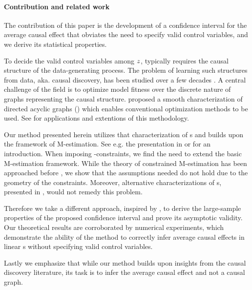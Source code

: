 \paragraph{Contribution and related work} The contribution of this paper is the development of a confidence interval for the average causal effect that obviates the need to specify valid control variables, and we derive its statistical properties.

To decide the valid control variables among $z$, typically requires the causal structure of the data-generating process. The problem of learning such structures from data, aka. causal discovery, has been studied over a few decades \citep{spirtes_causation_1993, pearl_causality:_2009,peters_elements_2017}. A central challenge of the field is to optimize model fitness over the discrete nature of graphs representing the causal structure. \citet{zheng_dags_2018} proposed a smooth characterization of directed acyclic graphs (\DAG{}) which enables conventional optimization methods to be used. See \citep{yu_daggnn_2019,ke_learning_2019,brouillard_diffrential_2020,zheng_learning_2020,kyono_2020} for applications and extentions of this methodology. 

Our method presented herein utilizes that characterization of \DAG{}s and builds upon the  framework of M-estimation. See e.g. the presentation in \citep[ch. 12]{wooldridge_econometric_2010} or \citet{vaart_m-_1998} for an introduction. 
When imposing \DAG{}-constraints, we find the need to extend the basic M-estimation framework. While the theory of constrained M-estimation has been approached before \citep{geyer_asymptotics_1994,shapiro_asymptotics_2000,andrews_estimation_1999, wang_asymptotics_1996}, we show that the assumptions needed do not hold due to the geometry of the  \DAG{} constraints. Moreover, alternative characterizations of \DAG{}s, presented in  \citet{wei_dags_2020}, would not remedy this problem.

Therefore we take a different approach, inspired by \citet{stoica_cramer-rao_1998}, to derive the large-sample properties of the proposed confidence interval and prove its asymptotic validity. Our theoretical results are corroborated by numerical experiments, which demonstrate the ability of the method to correctly infer average causal effects in linear \scm{}s without specifying valid control variables.

Lastly we emphasize that while our method builds upon insights from the causal discovery literature, its task is to infer the average causal effect and not a causal graph.
